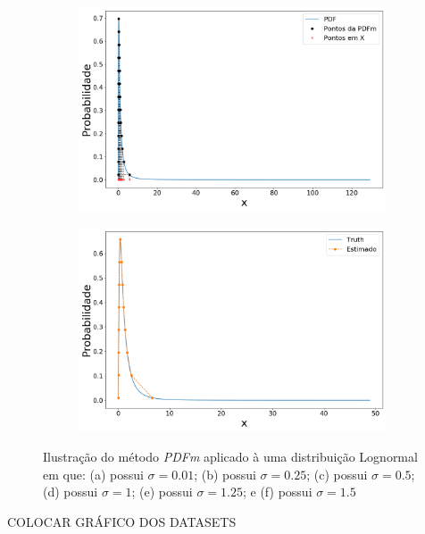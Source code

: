 \begin{figure}[H]
	\begin{subfigure}[b]{0.49\textwidth}
		\centering 
		\includegraphics[width=\textwidth]{./figuras/PDFm_lognormal_125}
		\caption{}
		\label{fig:pdflog125}
	\end{subfigure}
	\hfill
	\begin{subfigure}[b]{0.49\textwidth}
		\centering 
		\includegraphics[width=\textwidth]{./figuras/PDFm_lognormal_15}
		\caption{}
		\label{fig:pdflog150}
	\end{subfigure}
	\caption{Ilustração do método \textit{PDFm} aplicado à uma distribuição Lognormal em que: (a) possui $\sigma = 0.01$; (b) possui $\sigma = 0.25$; (c) possui $\sigma = 0.5$; (d) possui $\sigma = 1$; (e) possui $\sigma = 1.25$; e (f) possui $\sigma = 1.5$}
	\label{fig:Lognormal_pdf}
\end{figure}

{\color{red} COLOCAR GRÁFICO DOS DATASETS}

